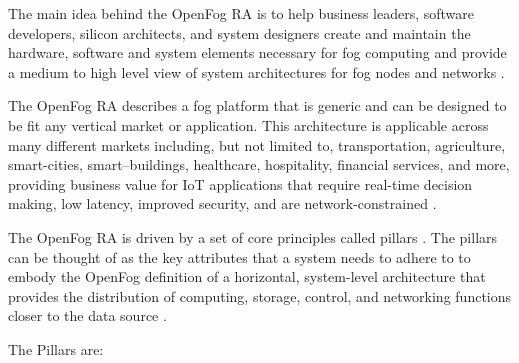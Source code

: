 \documentclass{article}
\begin{document}
The main idea behind the OpenFog RA is to help business leaders, software developers, silicon architects, and system designers create and maintain the hardware, software and system elements necessary for fog computing and provide a medium to high level view of system architectures for fog nodes and networks \cite{openfogconsortium2017}.

The OpenFog RA describes a fog platform that is generic and can be designed to be fit any vertical market or application. 
This architecture is applicable across many different markets including, but not limited to, transportation, agriculture, smart-cities, smart–buildings, healthcare, hospitality, financial services, and more, providing business value for IoT applications that require real-time decision making, low latency, improved security, and are network-constrained \cite{openfogconsortium2017}.

The OpenFog RA is driven by a set of core principles called pillars \cite{openfogconsortium2017}.
The pillars can be thought of as the key attributes that a system needs to adhere to to embody the OpenFog definition of a horizontal, system-level architecture that provides the distribution of computing, storage, control, and networking functions closer to the data source \cite{openfogconsortium2017}.

The Pillars \cite{openfogconsortium2017} are:
\end{document}
